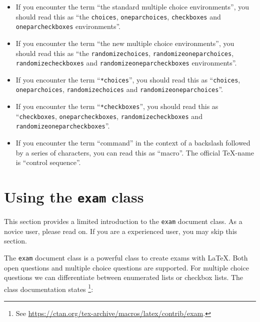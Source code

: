 \documentclass[12pt,a4paper]{exam}
\begin{document}
\begin{itemize}
\item If you encounter the term ``the standard multiple choice environments'',
you should read this as ``the \texttt{choices}, \texttt{oneparchoices},
\texttt{checkboxes} and \texttt{oneparcheckboxes} environments''.

\item If you encounter the term ``the new multiple choice environments'',
you should read this as ``the \texttt{randomizechoices}, \texttt{randomizeoneparchoices},
\texttt{randomizecheckboxes} and \texttt{randomizeoneparcheckboxes} environments''.

\item If you encounter the term ``\texttt{*choices}'', you should read this as
``\texttt{choices}, \texttt{oneparchoices}, \texttt{randomizechoices} and \texttt{randomizeoneparchoices}''.

\item If you encounter the term ``\texttt{*checkboxes}'', you should read this as
``\texttt{checkboxes}, \texttt{oneparcheckboxes}, \texttt{randomizecheckboxes} and
\texttt{randomizeoneparcheckboxes}''.

\item If you encounter the term ``command'' in the context of a backslash followed
by a series of characters, you can read this as ``macro''. The official \TeX-name
is ``control sequence''.
\end{itemize}


\section{Using the \texttt{exam} class}
This section provides a limited introduction to the \texttt{exam} document
class. As a novice user, please read on. If you are a experienced user,
you may skip this section.

The \verb|exam| document class is a powerful class to create exams
with \LaTeX{}. Both open questions and multiple choice questions are
supported. For multiple choice questions we can differentiate between
enumerated lists or checkbox lists. The class documentation states%
\footnote{See \url{https://ctan.org/tex-archive/macros/latex/contrib/exam}.}:
\end{document}
